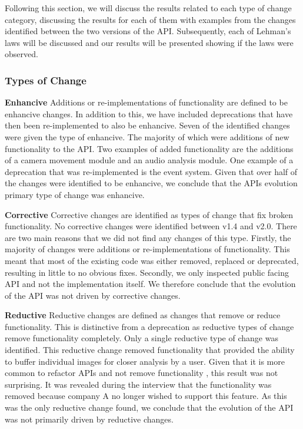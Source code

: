 \documentclass{sig-alternate}
\begin{document}
Following this section, we will discuss the results related to each type of change category, discussing the results for each of them with examples from the changes identified between the two versions of the API. Subsequently, each of Lehman's laws will be discussed and our results will be presented showing if the laws were observed.





\subsubsection{Types of Change}

\smallskip \noindent
\textbf{Enhancive  }
Additions or re-implementations of functionality are defined to be enhancive changes. In addition to this, we have included deprecations that have then been re-implemented to also be enhancive.
Seven of the identified changes were given the type of enhancive. The majority of which were additions of new functionality to the API. Two examples of added functionality are the additions of a camera movement module and an audio analysis module. One example of a deprecation that was re-implemented is the event system.
Given that over half of the changes were identified to be enhancive, we conclude that the APIs evolution primary type of change was enhancive. 

\smallskip \noindent
\textbf{Corrective  }
Corrective changes are identified as types of change that fix broken functionality.
No corrective changes were identified between v1.4 and v2.0. There are two main reasons that we did not find any changes of this type. Firstly, the majority of changes were additions or re-implementations of functionality. This meant that most of the existing code was either removed, replaced or deprecated, resulting in little to no obvious fixes. Secondly, we only inspected public facing API and not the implementation itself.
We therefore conclude that the evolution of the API was not driven by corrective changes.

 
\smallskip \noindent
\textbf{Reductive  }
Reductive changes are defined as changes that remove or reduce functionality. This is distinctive from a deprecation as reductive types of change remove functionality completely.
Only a single reductive type of change was identified. This reductive change removed functionality that provided the ability to buffer individual images for closer analysis by a user. Given that it is more common to refactor APIs and not remove functionality \cite{dig2005role, xing2006refactoring}, this result was not surprising. It was revealed during the interview that the functionality was removed because company A no longer wished to support this feature. 
As this was the only reductive change found, we conclude that the evolution of the API was not primarily driven by reductive changes.
\end{document}
